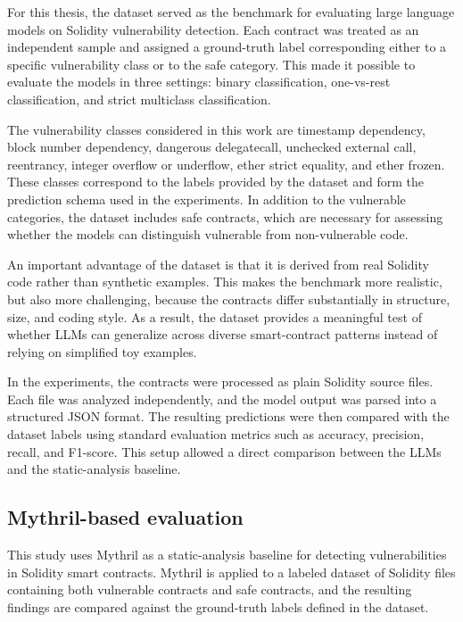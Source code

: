 \documentclass[a4paper,11pt]{article}\usepackage{graphicx} %
\begin{document}
For this thesis, the dataset served as the benchmark for evaluating large language models on Solidity vulnerability detection. Each contract was treated as an independent sample and assigned a ground-truth label corresponding either to a specific vulnerability class or to the safe category. This made it possible to evaluate the models in three settings: binary classification, one-vs-rest classification, and strict multiclass classification.

The vulnerability classes considered in this work are timestamp dependency, block number dependency, dangerous delegatecall, unchecked external call, reentrancy, integer overflow or underflow, ether strict equality, and ether frozen. These classes correspond to the labels provided by the dataset and form the prediction schema used in the experiments. In addition to the vulnerable categories, the dataset includes safe contracts, which are necessary for assessing whether the models can distinguish vulnerable from non-vulnerable code.

An important advantage of the dataset is that it is derived from real Solidity code rather than synthetic examples. This makes the benchmark more realistic, but also more challenging, because the contracts differ substantially in structure, size, and coding style. As a result, the dataset provides a meaningful test of whether LLMs can generalize across diverse smart-contract patterns instead of relying on simplified toy examples.

In the experiments, the contracts were processed as plain Solidity source files. Each file was analyzed independently, and the model output was parsed into a structured JSON format. The resulting predictions were then compared with the dataset labels using standard evaluation metrics such as accuracy, precision, recall, and F1-score. This setup allowed a direct comparison between the LLMs and the static-analysis baseline.

\subsection{Mythril-based evaluation}
\label{subsec:mythril_evaluation}

This study uses Mythril as a static-analysis baseline for detecting vulnerabilities in Solidity smart contracts. Mythril is applied to a labeled dataset of Solidity files containing both vulnerable contracts and safe contracts, and the resulting findings are compared against the ground-truth labels defined in the dataset.
\end{document}
